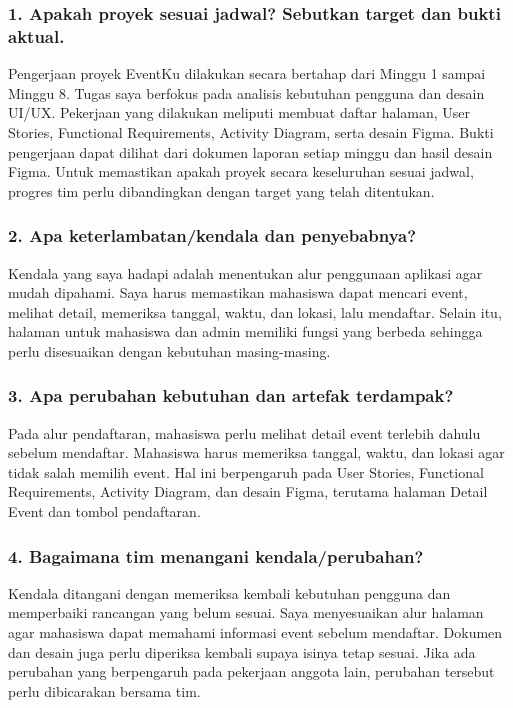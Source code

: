 \documentclass[11pt,a4paper]{article}
\begin{document}
\subsubsection*{1. Apakah proyek sesuai jadwal? Sebutkan target dan bukti aktual.}

Pengerjaan proyek EventKu dilakukan secara bertahap dari Minggu 1 sampai Minggu 8. Tugas saya berfokus pada analisis kebutuhan pengguna dan desain UI/UX. Pekerjaan yang dilakukan meliputi membuat daftar halaman, User Stories, Functional Requirements, Activity Diagram, serta desain Figma. Bukti pengerjaan dapat dilihat dari dokumen laporan setiap minggu dan hasil desain Figma. Untuk memastikan apakah proyek secara keseluruhan sesuai jadwal, progres tim perlu dibandingkan dengan target yang telah ditentukan.



\subsubsection*{2. Apa keterlambatan/kendala dan penyebabnya?}

Kendala yang saya hadapi adalah menentukan alur penggunaan aplikasi agar mudah dipahami. Saya harus memastikan mahasiswa dapat mencari event, melihat detail, memeriksa tanggal, waktu, dan lokasi, lalu mendaftar. Selain itu, halaman untuk mahasiswa dan admin memiliki fungsi yang berbeda sehingga perlu disesuaikan dengan kebutuhan masing-masing.



\subsubsection*{3. Apa perubahan kebutuhan dan artefak terdampak?}

Pada alur pendaftaran, mahasiswa perlu melihat detail event terlebih dahulu sebelum mendaftar. Mahasiswa harus memeriksa tanggal, waktu, dan lokasi agar tidak salah memilih event. Hal ini berpengaruh pada User Stories, Functional Requirements, Activity Diagram, dan desain Figma, terutama halaman Detail Event dan tombol pendaftaran.



\subsubsection*{4. Bagaimana tim menangani kendala/perubahan?}

Kendala ditangani dengan memeriksa kembali kebutuhan pengguna dan memperbaiki rancangan yang belum sesuai. Saya menyesuaikan alur halaman agar mahasiswa dapat memahami informasi event sebelum mendaftar. Dokumen dan desain juga perlu diperiksa kembali supaya isinya tetap sesuai. Jika ada perubahan yang berpengaruh pada pekerjaan anggota lain, perubahan tersebut perlu dibicarakan bersama tim.
\end{document}
